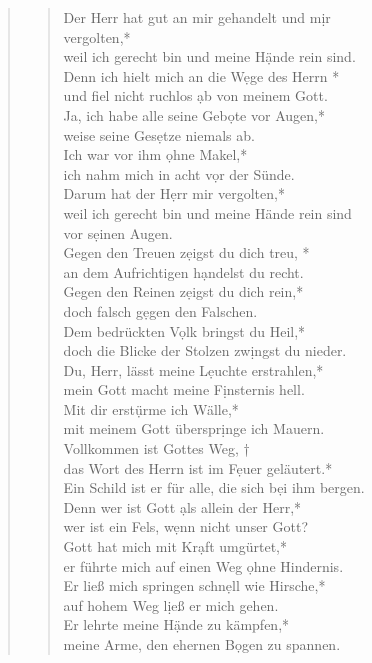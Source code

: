 \begin{quote}
\begin{verse}

Der Herr hat gut an mir gehandelt und m\d ir\\ vergolten,*\\
weil ich gerecht bin und meine H\d ände rein sind.\\ \vin
Denn ich hielt mich an die W\d ege des Herrn *\\ \vin
und fiel nicht ruchlos \d ab von meinem Gott.\\
Ja, ich habe alle seine Geb\d ote vor Augen,*\\
weise seine Ges\d etze niemals ab.\\ \vin
Ich war vor ihm \d ohne Makel,*\\ \vin
ich nahm mich in acht v\d or der Sünde.\\
Darum hat der H\d err mir vergolten,*\\
weil ich gerecht bin und meine Hände rein sind\\ vor s\d einen Augen.\\ \vin
Gegen den Treuen z\d eigst du dich treu, *\\ \vin
an dem Aufrichtigen h\d andelst du recht.\\

Gegen den Reinen z\d eigst du dich rein,*\\
doch falsch g\d egen den Falschen.\\ \vin
Dem bedrückten V\d olk bringst du Heil,*\\ \vin
doch die Blicke der Stolzen zw\d ingst du nieder.\\
Du, Herr, lässt meine L\d euchte erstrahlen,*\\
mein Gott macht meine F\d insternis hell.\\ \vin
Mit dir erst\d ürme ich Wälle,*\\ \vin
mit meinem Gott überspr\d inge ich Mauern.\\
Vollkommen ist Gottes Weg, †\\
das Wort des Herrn ist im F\d euer geläutert.*\\
Ein Schild ist er für alle, die sich b\d ei ihm bergen.\\ \vin
Denn wer ist Gott \d als allein der Herr,*\\ \vin
wer ist ein Fels, w\d enn nicht unser Gott?\\
Gott hat mich mit Kr\d aft umgürtet,*\\
er führte mich auf einen Weg \d ohne Hindernis.\\ \vin
Er ließ mich springen schn\d ell wie Hirsche,*\\ \vin
auf hohem Weg l\d ieß er mich gehen.\\
Er lehrte meine H\d ände zu kämpfen,*\\
meine Arme, den ehernen B\d ogen zu spannen.\\ 


\end{verse}
\end{quote}
